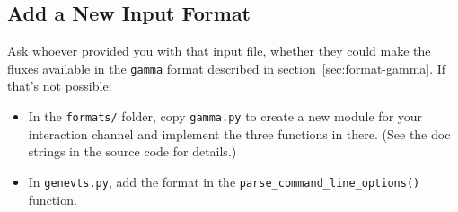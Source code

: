 \documentclass[11pt, oneside]{article}
\begin{document}
\subsection{Add a New Input Format}\label{sec:new-input-format}
Ask whoever provided you with that input file, whether they could make the fluxes available in the \texttt{gamma} format described in section~\ref{sec:format-gamma}.
If that’s not possible:
\begin{itemize}
\item In the \texttt{formats/} folder, copy \texttt{gamma.py} to create a new module for your interaction channel and implement the three functions in there.
(See the doc strings in the source code for details.)
\item In \texttt{genevts.py}, add the format in the \texttt{parse\_command\_line\_options()} function.
\end{itemize}


\clearpage
\footnotesize %


\end{document}
